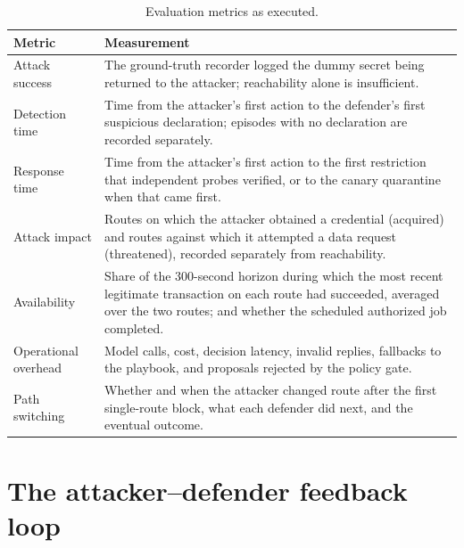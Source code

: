 \documentclass[10pt,a4paper]{article}
\begin{document}
\begin{table}[H]
\centering\footnotesize
\caption{Evaluation metrics as executed.}
\label{tab:metrics}
\begin{tabularx}{\textwidth}{P{3.2cm} L}
\toprule
\textbf{Metric} & \textbf{Measurement} \\
\midrule
Attack success & The ground-truth recorder logged the dummy secret being returned to the attacker; reachability alone is insufficient. \\
Detection time & Time from the attacker's first action to the defender's first suspicious declaration; episodes with no declaration are recorded separately. \\
Response time & Time from the attacker's first action to the first restriction that independent probes verified, or to the canary quarantine when that came first. \\
Attack impact & Routes on which the attacker obtained a credential (acquired) and routes against which it attempted a data request (threatened), recorded separately from reachability. \\
Availability & Share of the 300-second horizon during which the most recent legitimate transaction on each route had succeeded, averaged over the two routes; and whether the scheduled authorized job completed. \\
Operational overhead & Model calls, cost, decision latency, invalid replies, fallbacks to the playbook, and proposals rejected by the policy gate. \\
Path switching & Whether and when the attacker changed route after the first single-route block, what each defender did next, and the eventual outcome. \\
\bottomrule
\end{tabularx}
\end{table}

\section{The attacker--defender feedback loop}\label{app:loop}
\end{document}
